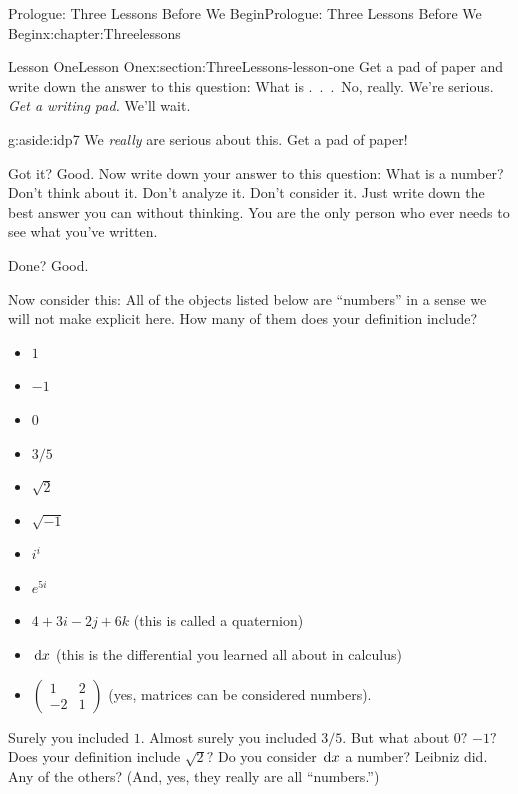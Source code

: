 \documentclass[oneside,10pt,]{book}
\numberwithin{equation}{section}
\newcommand{\dx}[1]{\,{\rm d}#1}
\newcommand{\amp}{&}
\begin{document}
\begin{chapterptx}{Prologue: Three Lessons Before We Begin}{}{Prologue: Three Lessons Before We Begin}{}{}{x:chapter:Threelessons}
%
%
\typeout{************************************************}
\typeout{************************************************}
%
\begin{sectionptx}{Lesson One}{}{Lesson One}{}{}{x:section:ThreeLessons-lesson-one}
Get a pad of paper and write down the answer to this question: What is .~.~.~No, really.  We're serious. \emph{Get a writing pad.} We'll wait.%
\begin{aside}{}{g:aside:idp7}%
We \emph{really} are serious about this. Get a pad of paper!%
\end{aside}
Got it? Good. Now write down your answer to this question: What is a number? Don't think about it. Don't analyze it. Don't consider it. Just write down the best answer you can without thinking. You are the only person who ever needs to see what you've written.%
\par
Done? Good.%
\par
Now consider this: All of the objects listed below are ``numbers'' in a sense we will not make explicit here. How many of them does your definition include?%
\par
%
\begin{itemize}[label=\textbullet]
\item{}\(\displaystyle 1\)%
\item{}\(\displaystyle -1\)%
\item{}\(\displaystyle 0\)%
\item{}\(\displaystyle 3/5\)%
\item{}\(\displaystyle \sqrt{2}\)%
\item{}\(\displaystyle \sqrt{-1}\)%
\item{}\(\displaystyle i^i\)%
\item{}\(\displaystyle e^{5i}\)%
\item{}\(4+3i-2j+6k\) (this is called a quaternion)%
\item{}\(\dx{x}\) (this is the differential you learned all about in calculus)%
\item{}\(\begin{pmatrix}
1\amp 2\\-2\amp 1
\end{pmatrix}\) (yes, matrices can be considered numbers).%
\end{itemize}
%
\par
Surely you included \(1\). Almost surely you included \(3/5\). But what about \(0?\) \(-1?\) Does your definition include \(\sqrt{2}?\) Do you consider \(\dx{x}\) a number? Leibniz did. Any of the others? (And, yes, they really are all ``numbers.'')%

\end{sectionptx}
\end{chapterptx}
\end{document}
